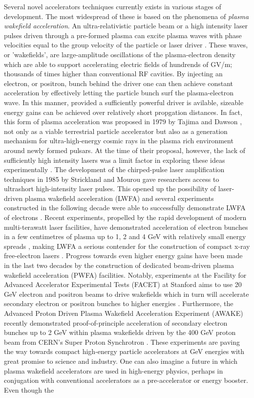 \indent Several novel accelerators techniques currently exists in various stages of development. The most widespread of these is based on the phenomena of \textit{plasma wakefield acceleration}. An ultra-relativistic particle beam or a high intensity laser pulses driven through a pre-formed plasma can excite plasma waves with phase velocities equal to the group velocity of the particle or laser driver \cite{Chen2002}. These waves, or 'wakefields', are large-amplitude oscillations of the plasma-electron density which are able to support accelerating electric fields of hundrends of GV/m; thousands of times higher than conventional RF cavities. By injecting an electron, or positron, bunch behind the driver one can then achieve constant acceleration by effectively letting the particle bunch surf the plasma-electron wave. In this manner, provided a sufficiently powerful driver is avilable, sizeable energy gains can be achieved over relatively short propgation distances. In fact, this form of plasma acceleration was proposed in 1979 by Tajima and Dawson \cite{Tajima1979a}, not only as a viable terrestrial particle accelerator but also as a generation mechanism for ultra-high-energy cosmic rays in the plasma rich environment around newly formed pulsars. At the time of their proposal, however, the lack of sufficiently high intensity lasers was a limit factor in exploring these ideas experimentally \cite{Esarey2009}. The development of the chirped-pulse laser amplification techniques in 1985 by Strickland and Mourou \cite{Strickland1985} gave researchers access to ultrashort high-intensity laser pulses. This opened up the possibility of laser-driven plasma wakefield acceleration (LWFA) and several experiments constructed in the following decade were able to successfully demonstrate LWFA of electrons \cite{Clayton1993}. Recent experiments, propelled by the rapid development of modern multi-terawatt laser facilities, have demonstrated acceleration of electron bunches in a few centimetres of plasma up to 1, 2 and 4 GeV with relatively small energy spreads \cite{Leemans, Wang2013,  Leemans2014}, making LWFA a serious contender for the construction of compact x-ray free-electron lasers \cite{Huang2012}. Progress towards even higher energy gains have been made in the last two decades by the construction of dedicated beam-driven plasma wakefield acceleration (PWFA) facilities. Notably, experiments at the Facility for Advanced Accelerator Experimental Tests (FACET) at Stanford aims to use 20 GeV electron and positron beams to drive wakefields which in turn will accelerate secondary electron or positron bunches to higher energies \cite{Facet}. Furthermore, the Advanced Proton Driven Plasma Wakefield Acceleration Experiment (AWAKE) recently demonstrated proof-of-principle acceleration of secondary electron bunches up to 2 GeV within plasma wakefields driven by the 400 GeV proton beam from CERN’s Super Proton Synchrotron \cite{Adli2018}. These experiments are paving the way towards compact high-energy particle accelerators at GeV energies with great promise to science and industry. One can also imagine a future in which plasma wakefield accelerators are used in high-energy physics, perhaps in conjugation with conventional accelerators as a pre-accelerator or energy booster. Even though the 